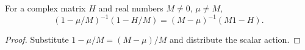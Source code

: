 \begin{lemma}
    \label{lem:affine_filter_normalization}
    \leanok
    For a complex matrix $H$ and real numbers $M\ne0$, $\mu\ne M$,
    \[
        (1-\mu/M)^{-1}(1-H/M)=(M-\mu)^{-1}(M1-H).
    \]
\end{lemma}
\begin{proof}\leanok
    Substitute $1-\mu/M=(M-\mu)/M$ and distribute the scalar action.
\end{proof}
